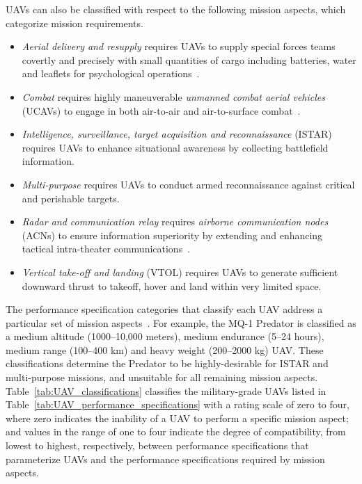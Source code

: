 UAVs can also be classified with respect to the following mission aspects, which categorize mission requirements.

\begin{itemize}

\item \emph{Aerial delivery and resupply} requires UAVs to supply special forces teams covertly and precisely with small quantities of cargo including batteries, water and leaflets for psychological operations~\cite{DoD_2005}.

\item \emph{Combat} requires highly maneuverable \emph{unmanned combat aerial vehicles} (UCAVs) to engage in both air-to-air and air-to-surface combat~\cite{Arjomandi}.

\item \emph{Intelligence, surveillance, target acquisition and reconnaissance} (ISTAR) requires UAVs to enhance situational awareness by collecting battlefield information.

\item \emph{Multi-purpose} requires UAVs to conduct armed reconnaissance against critical and perishable targets.

\item \emph{Radar and communication relay} requires \emph{airborne communication nodes} (ACNs) to ensure information superiority by extending and enhancing tactical intra-theater communications~\cite{DoD_2005}.

\item \emph{Vertical take-off and landing} (VTOL) requires UAVs to generate sufficient downward thrust to takeoff, hover and land within very limited space.

\end{itemize}

The performance specification categories that classify each UAV address a particular set of mission aspects~\cite{Arjomandi}. For example, the MQ-1 Predator is classified as a medium altitude (1000--10,000 meters), medium endurance (5--24 hours), medium range (100--400 km) and heavy weight (200--2000 kg) UAV\@. These classifications determine the Predator to be highly-desirable for ISTAR and multi-purpose missions, and unsuitable for all remaining mission aspects. Table~\ref{tab:UAV_classifications} classifies the military-grade UAVs listed in Table~\ref{tab:UAV_performance_specifications} with a rating scale of zero to four, where zero indicates the inability of a UAV to perform a specific mission aspect; and values in the range of one to four indicate the degree of compatibility, from lowest to highest, respectively, between performance specifications that parameterize UAVs and the performance specifications required by mission aspects.

